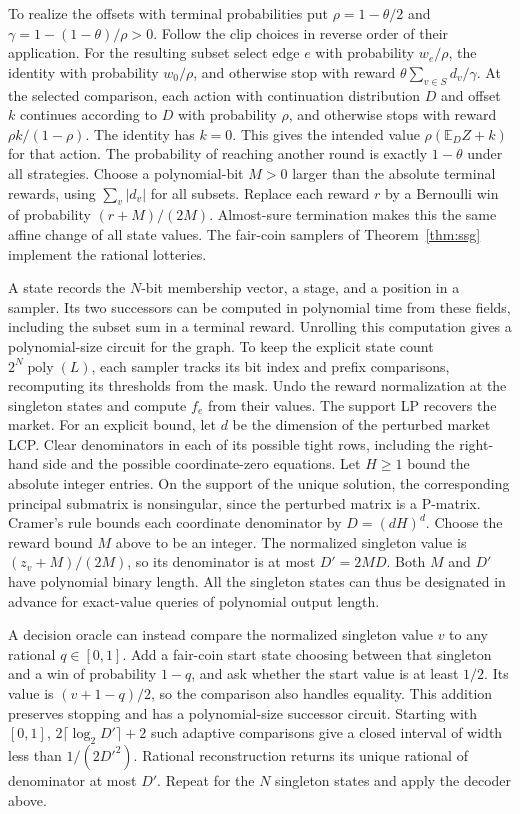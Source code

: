 \documentclass[11pt,oneside,openany,notitlepage]{report}
\begin{document}
To realize the offsets with terminal probabilities put
\(\rho=1-\theta/2\) and \(\gamma=1-(1-\theta)/\rho>0\). Follow the clip
choices in reverse order of their application. For the resulting subset
select edge \(e\) with probability \(w_e/\rho\), the identity with
probability \(w_0/\rho\), and otherwise stop with reward
\(\theta\sum_{v\in S}d_v/\gamma\). At the selected comparison, each
action with continuation distribution \(D\) and offset \(k\) continues
according to \(D\) with probability \(\rho\), and otherwise stops with
reward \(\rho k/(1-\rho)\). The identity has \(k=0\). This gives the
intended value \(\rho(\mathbb E_D Z+k)\) for that action. The probability
of reaching another round is exactly \(1-\theta\) under all strategies.
Choose a polynomial-bit \(M>0\) larger than the absolute terminal rewards,
using \(\sum_v|d_v|\) for all subsets. Replace each reward \(r\) by a
Bernoulli win of probability \((r+M)/(2M)\). Almost-sure termination
makes this the same affine change of all state values. The fair-coin
samplers of Theorem~\ref{thm:ssg} implement the rational lotteries.

A state records the \(N\)-bit membership vector, a stage, and a position
in a sampler. Its two successors can be computed in polynomial time from
these fields, including the subset sum in a terminal reward. Unrolling
this computation gives a polynomial-size circuit for the graph. To keep
the explicit state count \(2^N\operatorname{poly}(L)\), each sampler
tracks its bit index and prefix comparisons, recomputing its thresholds
from the mask. Undo the reward normalization at the singleton states and
compute \(f_e\) from their values. The support LP recovers the market.
For an explicit bound, let \(d\) be the dimension of the perturbed market
LCP. Clear denominators in each of its possible tight rows, including
the right-hand side and the possible coordinate-zero equations. Let \(H\ge1\)
bound the absolute integer entries. On the support of the unique solution,
the corresponding principal submatrix is nonsingular, since the perturbed
matrix is a P-matrix. Cramer's rule bounds each coordinate denominator by
\(D=(dH)^d\). Choose the reward bound \(M\) above to be an integer. The
normalized singleton value is \((z_v+M)/(2M)\), so its denominator is at
most \(D'=2MD\). Both \(M\) and \(D'\) have polynomial binary length.
All the singleton states can thus be designated in advance for exact-value
queries of polynomial output length.

A decision oracle can instead compare the normalized singleton value
\(v\) to any rational \(q\in[0,1]\). Add a fair-coin start state choosing
between that singleton and a win of probability \(1-q\), and ask whether
the start value is at least \(1/2\). Its value is \((v+1-q)/2\), so
the comparison also handles equality. This addition preserves stopping
and has a polynomial-size successor circuit. Starting with \([0,1]\),
\(2\lceil\log_2 D'\rceil+2\) such adaptive comparisons give a closed
interval of width less than \(1/(2D'^2)\). Rational reconstruction returns
its unique rational of denominator at most \(D'\). Repeat for the \(N\)
singleton states and apply the decoder above.
\end{document}
